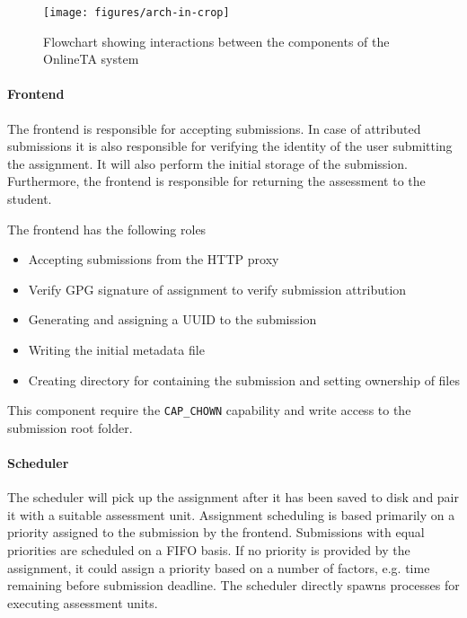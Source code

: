 \begin{figure}
\centering
\texttt{[image: figures/arch-in-crop]}

\caption{Flowchart showing interactions between the components of the
  OnlineTA system}
\label{fig:arch}
\end{figure}

\paragraph{Frontend}
The frontend is responsible for accepting submissions. In case of
attributed submissions it is also responsible for verifying the
identity of the user submitting the assignment. It will also perform
the initial storage of the submission. Furthermore, the frontend is
responsible for returning the assessment to the student.


The frontend has the following roles
\begin{itemize}
\item Accepting submissions from the HTTP proxy
\item Verify GPG signature of assignment to verify submission
  attribution
\item Generating and assigning a UUID to the submission
\item Writing the initial metadata file
\item Creating directory for containing the submission and setting
  ownership of files 
\end{itemize}

This component require the \texttt{CAP\_CHOWN} capability and write
access to the submission root folder.

\paragraph{Scheduler}
The scheduler will pick up the assignment after it has been saved to
disk and pair it with a suitable assessment unit. Assignment
scheduling is based primarily on a priority assigned to the submission
by the frontend. Submissions with equal priorities are scheduled on a
FIFO basis. If no priority is provided by the assignment, it could
assign a priority based on a number of factors, e.g. time remaining
before submission deadline. The scheduler directly spawns processes for
executing assessment units.

